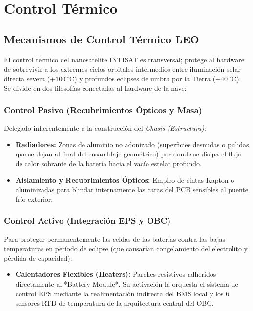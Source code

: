 \chapter{Control Térmico}

\section{Mecanismos de Control Térmico LEO}
El control térmico del nanosatélite INTISAT es transversal; protege al hardware de sobrevivir a los extremos ciclos orbitales intermedios entre iluminación solar directa severa ($+100\ ^\circ\text{C}$) y profundos eclipses de umbra por la Tierra ($-40\ ^\circ\text{C}$). Se divide en dos filosofías conectadas al hardware de la nave:

\subsection{Control Pasivo (Recubrimientos Ópticos y Masa)}
Delegado inherentemente a la construcción del \textit{Chasis (Estructura)}:
\begin{itemize}
    \item \textbf{Radiadores:} Zonas de aluminio no adonizado (superficies desnudas o pulidas que se dejan al final del ensamblaje geométrico) por donde se disipa el flujo de calor sobrante de la batería hacia el vacío estelar profundo.
    \item \textbf{Aislamiento y Recubrimientos Ópticos:} Empleo de cintas Kapton o aluminizadas para blindar internamente las caras del PCB sensibles al puente frío exterior. 
\end{itemize}

\subsection{Control Activo (Integración EPS y OBC)}
Para proteger permanentemente las celdas de las baterías contra las bajas temperaturas en período de eclipse (que causarían congelamiento del electrolito y pérdida de capacidad):
\begin{itemize}
    \item \textbf{Calentadores Flexibles (Heaters):} Parches resistivos adheridos directamente al *Battery Module*. Su activación la orquesta el sistema de control EPS mediante la realimentación indirecta del BMS local y los 6 sensores RTD de temperatura de la arquitectura central del OBC.
\end{itemize}

